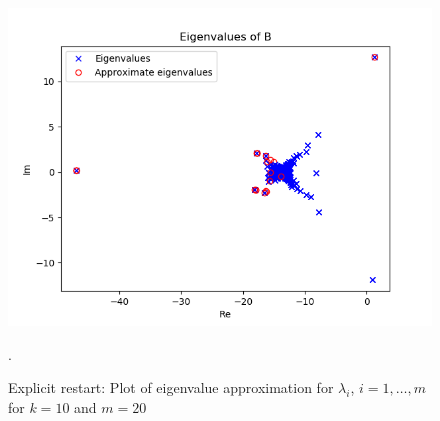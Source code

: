 \begin{figure}[h!]
\centering
\includegraphics[scale=0.8]{../task7/task7a3_k10m20.png}
\caption{Explicit restart: Plot of eigenvalue approximation for $\lambda_{i}$, $i = 1,\ldots,m$ for $k = 10$ and $m=20$}.
\label{fig:task7a2k10}
\end{figure}


